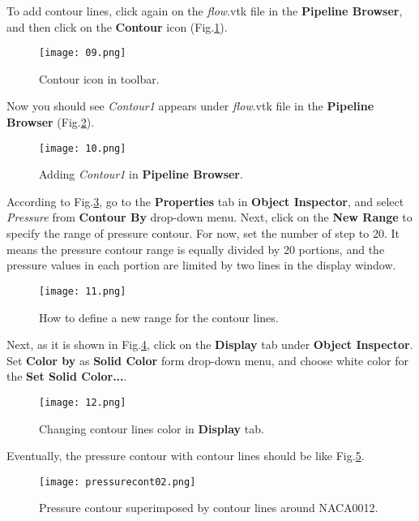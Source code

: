 To add contour lines, click again on the \textit{flow}.vtk file in the \textbf{Pipeline Browser}, and then click on the \textbf{Contour} icon (Fig.\ref{fig:contour_icon}).
\begin{figure}[htbp]
    \centering
    \texttt{[image: 09.png]}
    \caption{Contour icon in toolbar.}
    \label{fig:contour_icon}
\end{figure}
Now you should see \textit{Contour1} appears under \textit{flow}.vtk file in the \textbf{Pipeline Browser} (Fig.\ref{fig:contour1}).
\begin{figure}[htbp]
    \centering
    \texttt{[image: 10.png]}
    \caption{Adding \textit{Contour1} in \textbf{Pipeline Browser}.}
    \label{fig:contour1}
\end{figure}
According to Fig.\ref{fig:contourby}, go to the \textbf{Properties} tab in \textbf{Object Inspector}, and select \textit{Pressure} from \textbf{Contour By} drop-down menu. Next, click on the \textbf{New Range} to specify the range of pressure contour. For now, set the number of step to 20. It means the pressure contour range is equally divided by 20 portions, and the pressure values in each portion are limited by two lines in the display window.
\begin{figure}[htbp]
    \centering
    \texttt{[image: 11.png]}
    \caption{How to define a new range for the contour lines.}
    \label{fig:contourby}
\end{figure}
Next, as it is shown in Fig.\ref{fig:colorby2}, click on the \textbf{Display} tab under \textbf{Object Inspector}. Set \textbf{Color by} as \textbf{Solid Color} form drop-down menu, and choose white color for the \textbf{Set Solid Color...}.
\begin{figure}[htbp]
    \centering
    \texttt{[image: 12.png]}
    \caption{Changing contour lines color in \textbf{Display} tab.}
    \label{fig:colorby2}
\end{figure}
Eventually, the pressure contour with contour lines should be like Fig.\ref{fig:pressure_contour_lines}.
\begin{figure}[htbp]
    \centering
    \texttt{[image: pressurecont02.png]}
    \caption{Pressure contour superimposed by contour lines around NACA0012.}
    \label{fig:pressure_contour_lines}
\end{figure}

